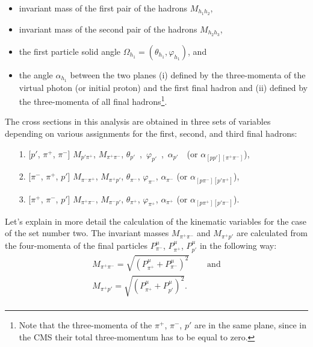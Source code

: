 \begin{itemize}
\item invariant mass of the first pair of the hadrons $M_{h_{1}h_{2}}$,\vspace{-0.4em}
\item invariant mass of the second pair of the hadrons $M_{h_{2}h_{3}}$,\vspace{-0.4em}
\item the first particle solid angle $\Omega_{h_{1}} = (\theta_{h_{1}}, \varphi_{h_{1}})$, and\vspace{-0.4em}
\item the angle $\alpha_{h_{1}}$ between the two planes (i) defined by the three-momenta of the virtual photon (or initial proton) and the first final hadron and (ii) defined by the three-momenta of all final hadrons\footnote[6]{Note that the three-momenta of the $\pi^{+}$, $\pi^{-}$, $p'$ are in the same plane, since in the CMS their total three-momentum has to be equal to zero.}.\vspace{-0.5em}
\end{itemize}

The cross sections in this analysis are obtained in three sets of variables depending on various assignments for the first, second, and third final hadrons:\vspace{-0.5em}
\begin{itemize}
\item[1.] [$p'$, $\pi^{+}$, $\pi^{-}$]
$M_{p'\pi^{+}}$, $M_{\pi^{+}\pi^{-}}$, $\theta_{p'}$~,~$\varphi_{p'}$~,~$\alpha_{p'}$~~(or $\alpha_{[pp'][\pi^{+}\pi^{-}]}$),\vspace{-0.75em}
\item[2.] [$\pi^{-}$, $\pi^{+}$, $p'$]
$M_{\pi^{-}\pi^{+}}$, $M_{\pi^{+}p'}$, $\theta_{\pi^{-}}$, $\varphi_{\pi^{-}}$, $\alpha_{\pi^{-}}$ (or $\alpha_{[p\pi^{-}][p'\pi^{+}]}$),\vspace{-0.75em}
\item[3.]  [$\pi^{+}$, $\pi^{-}$, $p'$]
$M_{\pi^{+}\pi^{-}}$, $M_{\pi^{-}p'}$, $\theta_{\pi^{+}}$, $\varphi_{\pi^{+}}$, $\alpha_{\pi^{+}}$ (or $\alpha_{[p\pi^{+}][p'\pi^{-}]}$).\vspace{-0.5em}
\end{itemize}


Let's explain in more detail the calculation of the kinematic variables for the case of the set number two. The invariant masses $M_{\pi^{+}\pi^{-}}$ and $M_{\pi^{+}p'}$ are calculated from the four-momenta of the final particles $P_{\pi^{-}}^{\mu}$, $P_{\pi^{+}}^{\mu}$, $P_{p'}^{\mu}$ in the following way:\vspace{-0.25em}
\begin{equation}
\begin{aligned}
M_{\pi^{+}\pi^{-}} = \sqrt{(P_{\pi^{+}}^{\mu} + P_{\pi^{-}}^{\mu})^{2}} & \text{~~~~and}\\ \label{invmasses}
M_{\pi^{+}p'} = \sqrt{(P_{\pi^{+}}^{\mu} + P_{p'}^{\mu})^{2}}. & \\
\end{aligned}  
\end{equation}  


